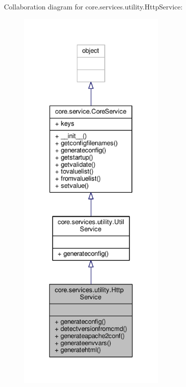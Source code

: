 Collaboration diagram for core.\+services.\+utility.\+Http\+Service\+:
\nopagebreak
\begin{figure}[H]
\begin{center}
\leavevmode
\includegraphics[height=550pt]{classcore_1_1services_1_1utility_1_1_http_service__coll__graph}
\end{center}
\end{figure}
